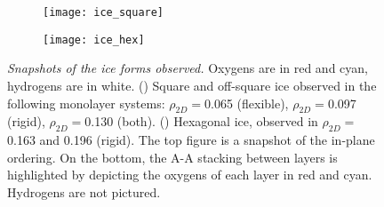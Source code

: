 \documentclass[12pt]{article}
\begin{document}
\begin{figure}[ht!]
	\centering
	\begin{subfigure}[b]{0.395\textwidth}
    		\texttt{[image: ice\_square]}
		\caption{}
        		\label{fig:ice_sq}
  	\end{subfigure}
	\begin{subfigure}[b]{0.285\textwidth}
    		\texttt{[image: ice\_hex]}
		\caption{}
        		\label{fig:ice_hx}
  	\end{subfigure}
	\caption{\textit{Snapshots of the ice forms observed.} Oxygens are in red and cyan, hydrogens are in white. (\protect{}) Square and off-square ice observed in the following monolayer systems: \(\rho_{2D}=\)0.065 (flexible), \(\rho_{2D}=\)0.097 (rigid), \(\rho_{2D}=\)0.130 (both). (\protect{}) Hexagonal ice, observed in \(\rho_{2D}=\)0.163 and 0.196 (rigid). The top figure is a snapshot of the in-plane ordering. On the bottom, the A-A stacking between layers is highlighted by depicting the oxygens of each layer in red and cyan. Hydrogens are not pictured.}
	\label{fig:ice_figs}
\end{figure}

\clearpage
\printbibliography
\end{document}
